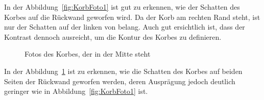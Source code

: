 In der Abbildung~\ref{fig:KorbFoto1} ist gut zu erkennen, wie der Schatten des Korbes auf die 
Rückwand geworfen wird. Da der Korb am rechten Rand steht, ist nur der Schatten auf der linken 
von belang. Auch gut ersichtlich ist, dass der Kontrast dennoch ausreicht, um die Kontur des Korbes zu definieren.
\newpage
%
\begin{figure}[h!]
\hfill
{}
\caption{Fotos des Korbes, der in der Mitte steht}
\label{fig:KorbFoto2}
\end{figure}
In der Abbildung~\ref{fig:KorbFoto2} ist zu erkennen, wie die Schatten des Korbes auf beiden Seiten der Rückwand geworfen werden, deren Ausprägung jedoch deutlich geringer wie in Abbildung~\ref{fig:KorbFoto1} ist.






